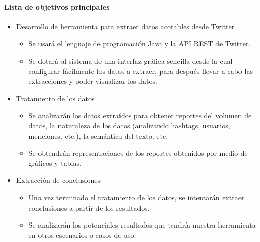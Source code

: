 \paragraph{Lista de objetivos principales}
\begin{itemize}
        \item Desarrollo de herramienta para extraer datos acotables desde Twitter
        \begin{itemize}
                \item Se usará el lenguaje de programación Java y la API REST de Twitter.
                \item Se dotará al sistema de una interfaz gráfica sencilla desde la cual configurar fácilmente los datos a extraer, para después llevar a cabo las extracciones y poder visualizar los datos.
        \end{itemize}
       	\item Tratamiento de los datos
       	\begin{itemize}
       		\item Se analizarán los datos extraídos para obtener reportes del volumen de datos, la naturaleza de los datos (analizando hashtags, usuarios, menciones, etc.), la semántica del texto, etc.
       		\item Se obtendrán representaciones de los reportes obtenidos por medio de gráficos y tablas.
       	\end{itemize}
       \item Extracción de conclusiones
       \begin{itemize}
       	\item Una vez terminado el tratamiento de los datos, se intentarán extraer conclusiones a partir de los resultados.
       	\item Se analizarán los potenciales resultados que tendría nuestra herramienta en otros escenarios o casos de uso.
       \end{itemize}
\end{itemize}
